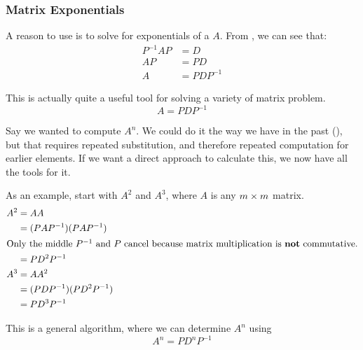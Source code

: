 \subsubsection{Matrix Exponentials}\label{subsubsec:Matrix_Exponentials}
A reason to use  is to solve for exponentials of a  $A$.
From , we can see that:
\begin{align*}
  P^{-1} A P &= D \\
  AP &= PD \\
  A &= P D P^{-1}
\end{align*}

This is actually quite a useful tool for solving a variety of matrix problem.
\begin{equation}\label{eq:Diagonalizable_A}
  A = P D P^{-1}
\end{equation}

Say we wanted to compute $A^{n}$.
We could do it the way we have in the past (), but that requires repeated substitution, and therefore repeated computation for earlier elements.
If we want a direct approach to calculate this, we now have all the tools for it.

\begin{blackbox}
  As an example, start with $A^{2}$ and $A^{3}$, where $A$ is any $m \times m$ matrix.
  \begin{align*}
    A^{2} &= A A \\
          &= (P A P^{-1}) (P A P^{-1}) \\
    \intertext{Only the middle $P^{-1}$ and $P$ cancel because matrix multiplication is \textbf{not} commutative.}
          &= P D^{2} P^{-1} \\
    A^{3} &= A A^{2} \\
          &= (P D P^{-1}) (P D^{2} P^{-1}) \\
          &= P D^{3} P^{-1}
  \end{align*}
\end{blackbox}

This is a general algorithm, where we can determine $A^{n}$ using 
\begin{equation}\label{eq:Matrix_Exponent_Diagonalized}
  A^{n} = P D^{n} P^{-1}
\end{equation}


